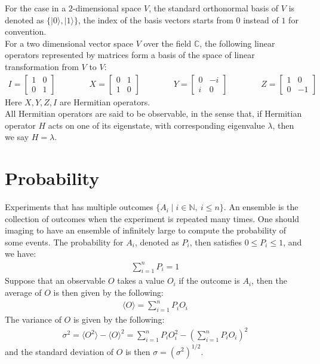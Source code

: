 \documentclass[11pt]{book}
\theoremstyle{break}
\theoremstyle{break}
\newcommand{\N}{\mathbb{N}}
\newcommand{\C}{\mathbb{C}}
\newcommand{\bmat}[1]{\begin{bmatrix} #1 \end{bmatrix}}
\begin{document}
For the case in a $2$-dimensional space $V$, the standard orthonormal basis of $V$ is denoted as $\{|0\rangle, |1\rangle\}$, the index of the basis vectors starts from $0$ instead of $1$ for convention.\\

For a two dimensional vector space $V$ over the field $\C$, the following linear operators represented by matrices form a basis of the space of linear transformation from $V$ to $V$:
\begin{align*}
I = \bmat{1 & 0 \\ 0 &1}\qquad\qquad X = \bmat{0 & 1 \\ 1 & 0} \qquad\qquad Y = \bmat{0 & -i \\ i & 0} \qquad\qquad Z = \bmat{1&0 \\0&-1}
\end{align*}
Here $X,Y,Z,I$ are Hermitian operators.\\

All Hermitian operators are said to be observable, in the sense that, if Hermitian operator $H$ acts on one of its eigenstate, with corresponding eigenvalue $\lambda$, then we say $H = \lambda$. \\


\section[Probability]{\color{red}Probability\color{black}}
Experiments that has multiple outcomes $\{A_i \mid i \in \N,\ i\leq n\}$. An ensemble is the collection of outcomes when the experiment is repeated many times. One should imaging to have an ensemble of infinitely large to compute the probability of some events. The probability for $A_i$, denoted as $P_i$, then satisfies $0\leq P_i \leq 1$, and we have:
\begin{align*}
\sum_{i=1}^n P_i = 1
\end{align*}
Suppose that an observable $O$ takes a value $O_i$ if the outcome is $A_i$, then the average of $O$ is then given by the following:
\begin{align*}
\langle O \rangle = \sum_{i=1}^n P_i O_i
\end{align*}
The variance of $O$ is given by the following:
\begin{align*}
\sigma^2 = \langle O^2 \rangle - \langle O \rangle^2 = \sum_{i=1}^n P_i O_i^2 - \left(\sum_{i=1}^n P_i O_i \right)^2
\end{align*}
and the standard deviation of $O$ is then $\sigma = (\sigma^2)^{1/2}$.\\
\end{document}
